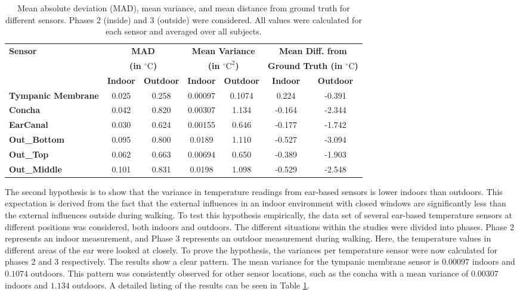 \begin{table}[t]
\centering
\begin{tabular}{|p{2.5cm}|c|c|c|c|c|c|}
\hline
\textbf{Sensor} & \multicolumn{2}{c|}{\textbf{MAD}} & \multicolumn{2}{c|}{\textbf{Mean Variance}} & \multicolumn{2}{c|}{\textbf{Mean Diff. from}} \\
 & \multicolumn{2}{c|}{\textbf{(in \(^\circ\text{C}\))}} & \multicolumn{2}{c|}{\textbf{(in \(^\circ\text{C}^2\))}} & \multicolumn{2}{c|}{\textbf{Ground Truth (in \(^\circ\text{C}\))}} \\
\hline
 & \textbf{Indoor} & \textbf{Outdoor} & \textbf{Indoor} & \textbf{Outdoor} & \textbf{Indoor} & \textbf{Outdoor} \\
\hline
\textbf{Tympanic Membrane} & 0.025 & 0.258 & 0.00097 & 0.1074 & 0.224 & -0.391 \\
\textbf{Concha} & 0.042 & 0.820 & 0.00307 & 1.134 & -0.164 & -2.344 \\
\textbf{EarCanal} & 0.030 & 0.624 & 0.00155 & 0.646 & -0.177 & -1.742 \\
\textbf{Out\_Bottom} & 0.095 & 0.800 & 0.0189 & 1.110 & -0.527 & -3.094 \\
\textbf{Out\_Top} & 0.062 & 0.663 & 0.00694 & 0.650 & -0.389 & -1.903 \\
\textbf{Out\_Middle} & 0.101 & 0.831 & 0.0198 & 1.098 & -0.529 & -2.548 \\
\hline
\end{tabular}
\caption{Mean absolute deviation (MAD), mean variance, and mean distance from ground truth for different sensors. Phases 2 (inside) and 3 (outside) were considered. All values were calculated for each sensor and averaged over all subjects.}
\label{subsec:Evaluation:Study1:Hypothesis2:mean_variance_table}
\end{table}

The second hypothesis is to show that the variance in temperature readings from ear-based sensors is lower indoors than outdoors.
This expectation is derived from the fact that the external influences in an indoor environment with closed windows are significantly less than the external influences outside during walking.
To test this hypothesis empirically, the data set of several ear-based temperature sensors at different positions was considered, both indoors and outdoors.
The different situations within the studies were divided into phases. 
Phase 2 represents an indoor measurement, and Phase 3 represents an outdoor measurement during walking.
Here, the temperature values in different areas of the ear were looked at closely.
To prove the hypothesis, the variances per temperature sensor were now calculated for phases 2 and 3 respectively. 
The results show a clear pattern. 
The mean variance for the tympanic membrane sensor is $0.00097$ indoors and $0.1074$ outdoors.
This pattern was consistently observed for other sensor locations, such as the concha with a mean variance of $0.00307$ indoors and $1.134$ outdoors.
A detailed listing of the results can be seen in Table \ref{subsec:Evaluation:Study1:Hypothesis2:mean_variance_table}.

